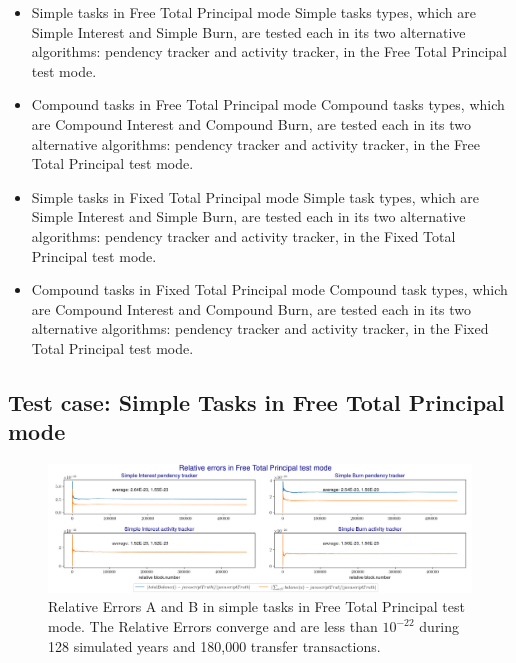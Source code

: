 \documentclass{article}
\begin{document}
\begin{itemize}
  \item {Simple tasks in Free Total Principal mode} \newline
  Simple tasks types, which are Simple Interest and Simple Burn, are tested 
  each in its two alternative algorithms: pendency tracker and activity tracker,
  in the Free Total Principal test mode.
  
  \item {Compound tasks in Free Total Principal mode} \newline
  Compound tasks types, which are Compound Interest and Compound Burn, are tested 
  each in its two alternative algorithms: pendency tracker and activity tracker, 
  in the Free Total Principal test mode.

  \item {Simple tasks in Fixed Total Principal mode} \newline
  Simple task types, which are Simple Interest and Simple Burn, are tested 
  each in its two alternative algorithms: pendency tracker and activity tracker, 
  in the Fixed Total Principal test mode.

  \item {Compound tasks in Fixed Total Principal mode} \newline
  Compound task types, which are Compound Interest and Compound Burn, are tested 
  each in its two alternative algorithms: pendency tracker and activity tracker, 
  in the Fixed Total Principal test mode.

\end{itemize}

\subsection{Test case: Simple Tasks in Free Total Principal mode}

\begin{figure}[H]
  \centering
  \includegraphics[width=5.3in]{images/6.3_free_sim_relative.jpg}
  \caption{Relative Errors A and B in simple tasks 
  in Free Total Principal test mode.
  The Relative Errors converge 
  and are less than $10^{-22}$ during 128 simulated years and 
  180,000 transfer transactions. 
  }
  \label{fig:free_sim_absolute_case}
\end{figure}
\end{document}
